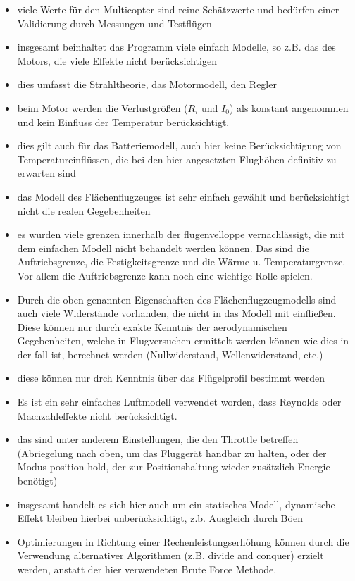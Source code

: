 \begin{itemize}
	\item viele Werte für den Multicopter sind reine Schätzwerte und bedürfen einer Validierung durch Messungen und Testflügen
	\item insgesamt beinhaltet das Programm viele einfach Modelle, so z.B. das des Motors, die viele Effekte nicht berücksichtigen
	\item dies umfasst die Strahltheorie, das Motormodell, den Regler
	\item beim Motor werden die Verlustgrößen (\ensuremath{R_i} und \ensuremath{I_0}) als konstant angenommen und kein Einfluss der Temperatur berücksichtigt.
	\item dies gilt auch für das Batteriemodell, auch hier keine Berücksichtigung von Temperatureinflüssen, die bei den hier angesetzten Flughöhen definitiv zu erwarten sind 
	\item das Modell des Flächenflugzeuges ist sehr einfach gewählt und berücksichtigt nicht die realen Gegebenheiten
	\item es wurden viele grenzen innerhalb der flugenvelloppe vernachlässigt, die mit dem einfachen Modell nicht behandelt werden können. Das sind die Auftriebsgrenze, die Festigkeitsgrenze und die Wärme u. Temperaturgrenze. Vor allem die Auftriebsgrenze kann noch eine wichtige Rolle spielen. 
	\item Durch die oben genannten Eigenschaften des Flächenflugzeugmodells sind auch viele Widerstände vorhanden, die nicht in das Modell mit einfließen. Diese können nur durch exakte Kenntnis der aerodynamischen Gegebenheiten, welche in Flugversuchen ermittelt werden können wie dies in \cite{Ostler.2006} der fall ist, berechnet werden (Nullwiderstand, Wellenwiderstand, etc.)
	\item diese können nur drch Kenntnis über das Flügelprofil bestimmt werden
	\item Es ist ein sehr einfaches Luftmodell verwendet worden, dass Reynolds oder Machzahleffekte nicht berücksichtigt. 
	\item das sind unter anderem Einstellungen, die den Throttle betreffen (Abriegelung nach oben, um das Fluggerät handbar zu halten, oder der Modus position hold, der zur Positionshaltung wieder zusätzlich Energie benötigt)
	\item insgesamt handelt es sich hier auch um ein statisches Modell, dynamische Effekt bleiben hierbei unberücksichtigt, z.b. Ausgleich durch Böen
	\item Optimierungen in Richtung einer Rechenleistungserhöhung können durch die Verwendung alternativer Algorithmen (z.B. divide and conquer) erzielt werden, anstatt der hier verwendeten Brute Force Methode.

\end{itemize}
